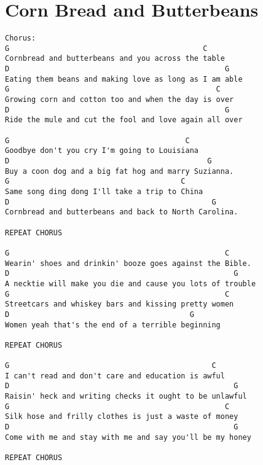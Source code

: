 \documentclass[leqno]{memoir}
\begin{document}
\newpage



\chapter{Corn Bread and Butterbeans}
\begin{verbatim}
Chorus:
G                                            C
Cornbread and butterbeans and you across the table
D                                                 G
Eating them beans and making love as long as I am able
G                                               C
Growing corn and cotton too and when the day is over
D                                                 G
Ride the mule and cut the fool and love again all over

G                                        C
Goodbye don't you cry I'm going to Louisiana
D                                             G
Buy a coon dog and a big fat hog and marry Suzianna.
G                                       C
Same song ding dong I'll take a trip to China
D                                              G
Cornbread and butterbeans and back to North Carolina.

REPEAT CHORUS

G                                                 C
Wearin' shoes and drinkin' booze goes against the Bible.
D                                                   G
A necktie will make you die and cause you lots of trouble
G                                                 C
Streetcars and whiskey bars and kissing pretty women
D                                         G
Women yeah that's the end of a terrible beginning

REPEAT CHORUS

G                                              C
I can't read and don't care and education is awful
D                                                   G
Raisin' heck and writing checks it ought to be unlawful
G                                                 C
Silk hose and frilly clothes is just a waste of money
D                                                   G
Come with me and stay with me and say you'll be my honey

REPEAT CHORUS
\end{verbatim}
\newpage
\end{document}
